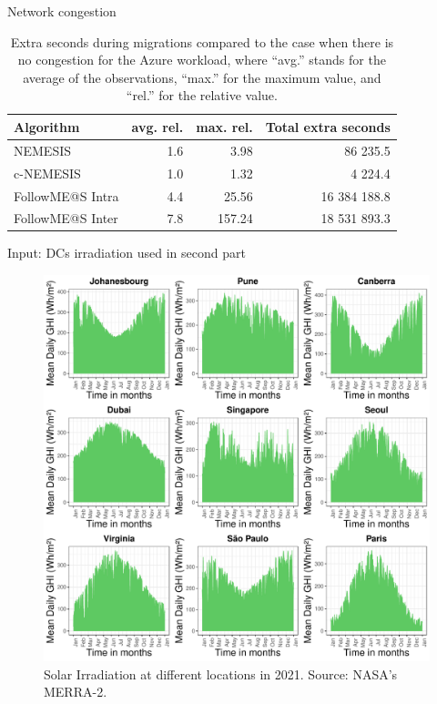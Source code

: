 \documentclass[Ligatures=TeX,table,svgnames,usetotalslideindicator,compress,10pt,aspectratio=169]{beamer}
\begin{document}
\begin{frame}{Network congestion}  
  
  \begin{table}[!ht]
    \small	
    \caption{Extra seconds during migrations compared to the case when
      there is no congestion for the Azure workload, where  ``avg.'' stands for the average of the observations, ``max.'' for the maximum value, and ``rel.'' for the relative value.} \label{ tab:wasted_seconds } \centering
    \begin{tabular}{|l|r|r|r|}
      \hline      
      \textbf{Algorithm}  & \textbf{avg. rel.} &  \textbf{max. rel.} &
                                                                       \textbf{Total
                                                                       extra
                                                                       seconds}
      \\
      \hline
      NEMESIS   & 1.6 & 3.98  & 86 235.5 \\
      \hline
      c-NEMESIS & 1.0 & 1.32  & 4 224.4\\
      \hline      
      FollowME@S Intra & 4.4 & 25.56  & 16 384 188.8  \\
      \hline      
      FollowME@S Inter & 7.8 & 157.24  & 18 531 893.3 \\      
      \hline

    \end{tabular}
  \end{table}
  \normalsize  
\end{frame}

\begin{frame}{Input: DCs irradiation used in second part}
      \begin{center}
        \begin{figure}[!h]
          \centering
          \includegraphics[width=.5\textwidth]{images/pv_ghi.pdf}
          \caption{Solar Irradiation at different locations in
            2021. Source: NASA's MERRA-2.}
        \end{figure}
      \end{center}
\end{frame}
\end{document}
